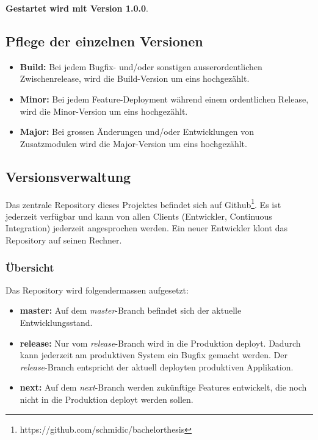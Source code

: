 \textbf{Gestartet wird mit Version 1.0.0}. 
\subsection{Pflege der einzelnen Versionen}
\begin{itemize}
\item \textbf{Build:} Bei jedem Bugfix- und/oder sonstigen ausserordentlichen Zwischenrelease, wird die Build-Version um eins hochgezählt.
\item \textbf{Minor:} Bei jedem Feature-Deployment während einem ordentlichen Release, wird die Minor-Version um eins hochgezählt.
\item \textbf{Major:} Bei grossen Änderungen und/oder Entwicklungen von Zusatzmodulen wird die Major-Version um eins hochgezählt.

\end{itemize}


\subsection{Versionsverwaltung}
Das zentrale Repository dieses Projektes befindet sich auf Github\footnote{https://github.com/schmidic/bachelorthesis}. Es ist jederzeit verfügbar und kann von allen Clients (Entwickler, Continuous Integration) jederzeit angesprochen werden. Ein neuer Entwickler klont das Repository auf seinen Rechner.
\subsubsection{Übersicht}
Das Repository wird folgendermassen aufgesetzt:
\begin{itemize}
\item \textbf{master:} Auf dem \textit{master}-Branch befindet sich der aktuelle Entwicklungsstand. 
\item \textbf{release:} Nur vom \textit{release}-Branch wird in die Produktion deployt. Dadurch kann jederzeit am produktiven System ein Bugfix gemacht werden. Der \textit{release}-Branch entspricht der aktuell deployten produktiven Applikation.
\item \textbf{next:} Auf dem \textit{next}-Branch werden zukünftige Features entwickelt, die noch nicht in die Produktion deployt werden sollen.
\end{itemize}

